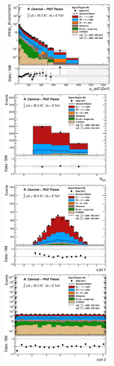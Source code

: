 \begin{figure}[!ht]
  \begin{center}
    \mbox{
      \includegraphics[width=0.495\textwidth]{MonojetAnalysis/Figures/plot_Stop_A3_SR_pt2_fitted.eps}
      \includegraphics[width=0.495\textwidth]{MonojetAnalysis/Figures/plot_Stop_A3_SR_n_jets_fitted.eps}
    }
    \mbox{
      \includegraphics[width=0.495\textwidth]{MonojetAnalysis/Figures/plot_Stop_A3_SR_eta2_fitted.eps}
      \includegraphics[width=0.495\textwidth]{MonojetAnalysis/Figures/plot_Stop_A3_SR_phi2_fitted.eps}
}
\end{center}
\end{figure}
